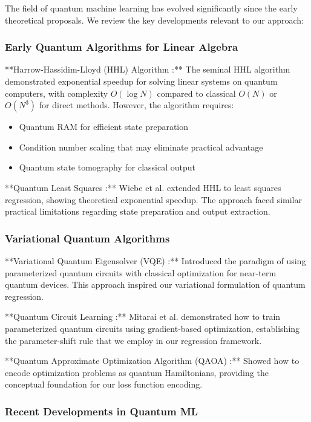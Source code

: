 \documentclass[11pt]{article}
\begin{document}
The field of quantum machine learning has evolved significantly since the early theoretical proposals. We review the key developments relevant to our approach:

\subsubsection{Early Quantum Algorithms for Linear Algebra}

**Harrow-Hassidim-Lloyd (HHL) Algorithm \cite{harrow2009quantum}:** The seminal HHL algorithm demonstrated exponential speedup for solving linear systems on quantum computers, with complexity $O(\log N)$ compared to classical $O(N)$ or $O(N^3)$ for direct methods. However, the algorithm requires:
\begin{itemize}
\item Quantum RAM for efficient state preparation
\item Condition number scaling that may eliminate practical advantage
\item Quantum state tomography for classical output
\end{itemize}

**Quantum Least Squares \cite{wiebe2012quantum}:** Wiebe et al. extended HHL to least squares regression, showing theoretical exponential speedup. The approach faced similar practical limitations regarding state preparation and output extraction.

\subsubsection{Variational Quantum Algorithms}

**Variational Quantum Eigensolver (VQE) \cite{peruzzo2014variational}:** Introduced the paradigm of using parameterized quantum circuits with classical optimization for near-term quantum devices. This approach inspired our variational formulation of quantum regression.

**Quantum Circuit Learning \cite{mitarai2018quantum}:** Mitarai et al. demonstrated how to train parameterized quantum circuits using gradient-based optimization, establishing the parameter-shift rule that we employ in our regression framework.

**Quantum Approximate Optimization Algorithm (QAOA) \cite{farhi2014quantum}:** Showed how to encode optimization problems as quantum Hamiltonians, providing the conceptual foundation for our loss function encoding.

\subsubsection{Recent Developments in Quantum ML}
\end{document}
